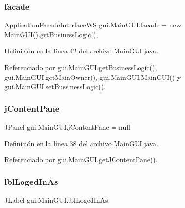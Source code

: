 \subsubsection{\texorpdfstring{facade}{facade}}
{\footnotesize\ttfamily \mbox{\hyperlink{interfacebusiness_logic_1_1_application_facade_interface_w_s}{Application\+Facade\+Interface\+WS}} gui.\+Main\+G\+U\+I.\+facade = new \mbox{\hyperlink{classgui_1_1_main_g_u_i}{Main\+G\+UI}}().\mbox{\hyperlink{classgui_1_1_main_g_u_i_a037b3ca54b0c61d6899721ff55cca365}{get\+Business\+Logic}}()\hspace{0.3cm}{\ttfamily [static]}, {\ttfamily [private]}}



Definición en la línea 42 del archivo Main\+G\+U\+I.\+java.



Referenciado por gui.\+Main\+G\+U\+I.\+get\+Business\+Logic(), gui.\+Main\+G\+U\+I.\+get\+Main\+Owner(), gui.\+Main\+G\+U\+I.\+Main\+G\+U\+I() y gui.\+Main\+G\+U\+I.\+set\+Bussiness\+Logic().

\mbox{\label{classgui_1_1_main_g_u_i_a06836509371b16181fdff6732938b7d3}} 
\subsubsection{\texorpdfstring{jContentPane}{jContentPane}}
{\footnotesize\ttfamily J\+Panel gui.\+Main\+G\+U\+I.\+j\+Content\+Pane = null\hspace{0.3cm}{\ttfamily [private]}}



Definición en la línea 38 del archivo Main\+G\+U\+I.\+java.



Referenciado por gui.\+Main\+G\+U\+I.\+get\+J\+Content\+Pane().

\mbox{\label{classgui_1_1_main_g_u_i_af3b413265c0986faec49a4859f97416d}} 
\subsubsection{\texorpdfstring{lblLogedInAs}{lblLogedInAs}}
{\footnotesize\ttfamily J\+Label gui.\+Main\+G\+U\+I.\+lbl\+Loged\+In\+As\hspace{0.3cm}{\ttfamily [private]}}




